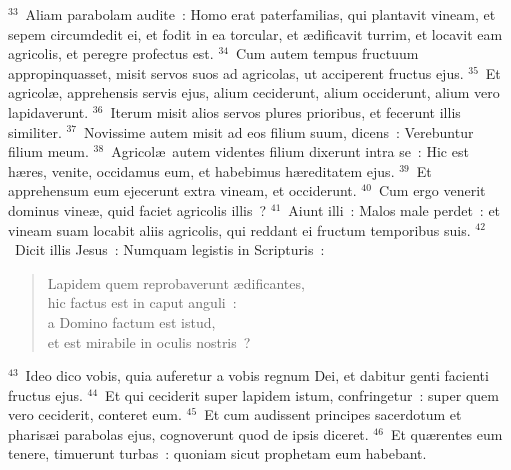 ${}^{33}$~Aliam parabolam audite~: Homo erat paterfamilias, qui plantavit vineam, et sepem circumdedit ei, et fodit in ea torcular, et \ae dificavit turrim, et locavit eam agricolis, et peregre profectus est.
${}^{34}$~Cum autem tempus fructuum appropinquasset, misit servos suos ad agricolas, ut acciperent fructus ejus.
${}^{35}$~Et agricol\ae , apprehensis servis ejus, alium ceciderunt, alium occiderunt, alium vero lapidaverunt.
${}^{36}$~Iterum misit alios servos plures prioribus, et fecerunt illis similiter.
${}^{37}$~Novissime autem misit ad eos filium suum, dicens~: Verebuntur filium meum.
${}^{38}$~Agricol\ae\ autem videntes filium dixerunt intra se~: Hic est h\ae res, venite, occidamus eum, et habebimus h\ae reditatem ejus.
${}^{39}$~Et apprehensum eum ejecerunt extra vineam, et occiderunt.
${}^{40}$~Cum ergo venerit dominus vine\ae , quid faciet agricolis illis~?
${}^{41}$~Aiunt illi~: Malos male perdet~: et vineam suam locabit aliis agricolis, qui reddant ei fructum temporibus suis.
${}^{42}$~Dicit illis Jesus~: Numquam legistis in Scripturis~: \begin{flushleft}\begin{verse}Lapidem quem reprobaverunt \ae dificantes,\\ hic factus est in caput anguli~:\\ a Domino factum est istud,\\ et est mirabile in oculis nostris~?\end{verse}\end{flushleft}


${}^{43}$~Ideo dico vobis, quia auferetur a vobis regnum Dei, et dabitur genti facienti fructus ejus.
${}^{44}$~Et qui ceciderit super lapidem istum, confringetur~: super quem vero ceciderit, conteret eum.
${}^{45}$~Et cum audissent principes sacerdotum et pharis\ae i parabolas ejus, cognoverunt quod de ipsis diceret.
${}^{46}$~Et qu\ae rentes eum tenere, timuerunt turbas~: quoniam sicut prophetam eum habebant.

